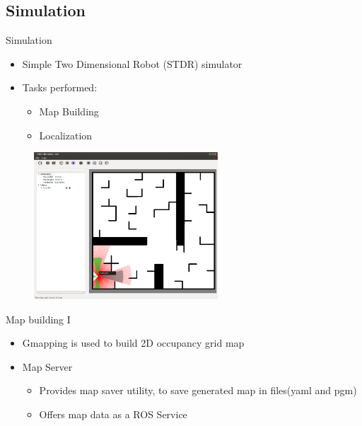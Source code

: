 
\subsection{Simulation}

\begin{frame}{Simulation}
    \begin{itemize}
        \item Simple Two Dimensional Robot (STDR) simulator	
        \item Tasks  performed:
        \begin{itemize}
            \item Map Building
            \item Localization
        \end{itemize}
    \end{itemize}
    
    \centering
    \includegraphics[width=90mm,height=55mm]{gfx/stdr_simulator}
    
\end{frame}
\begin{frame}{Map building I}
    \begin{itemize}
        \item Gmapping is used to build 2D occupancy grid map 

        \item Map Server
        \begin{itemize}
            \item Provides map saver utility, to save generated map in files(yaml and pgm)
            \item Offers map data as a ROS Service
        \end{itemize}
        
    \end{itemize}
\end{frame}

